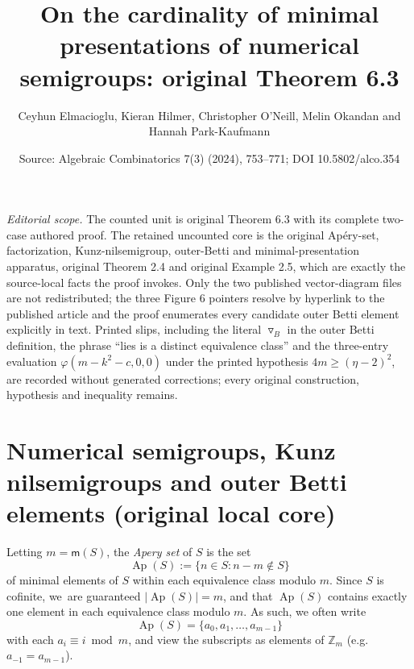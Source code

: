 \documentclass[10pt,a4paper]{amsart}
\title[Presentation cardinality in embedding dimension four]{On the cardinality of minimal presentations of numerical semigroups: original Theorem 6.3}
\author{Ceyhun Elmacioglu, Kieran Hilmer, Christopher O'Neill, Melin Okandan and Hannah Park-Kaufmann}
\date{Source: Algebraic Combinatorics 7(3) (2024), 753--771; DOI 10.5802/alco.354}
\newcommand\ZZ{\mathbb{Z}}
\DeclareMathOperator\Ap{Ap}
\begin{document}
\maketitle
\noindent\textit{Editorial scope.} The counted unit is original Theorem 6.3 with its complete two-case authored proof. The retained uncounted core is the original Ap\'ery-set, factorization, Kunz-nilsemigroup, outer-Betti and minimal-presentation apparatus, original Theorem 2.4 and original Example 2.5, which are exactly the source-local facts the proof invokes. Only the two published vector-diagram files are not redistributed; the three Figure 6 pointers resolve by hyperlink to the published article and the proof enumerates every candidate outer Betti element explicitly in text. Printed slips, including the literal $\triangledown_B$ in the outer Betti definition, the phrase ``lies is a distinct equivalence class'' and the three-entry evaluation $\varphi(m-k^2-c,0,0)$ under the printed hypothesis $4m\geq(\eta-2)^2$, are recorded without generated corrections; every original construction, hypothesis and inequality remains.
\section{Numerical semigroups, Kunz nilsemigroups and outer Betti elements (original local core)}
Letting $m = \mathsf m(S)$, the \emph{Apery set} of $S$ is the set
$$\Ap(S) := \{n \in S: n - m \notin S\}$$
of minimal elements of $S$ within each equivalence class modulo $m$.  Since $S$ is cofinite, we~are guaranteed $|\!\Ap(S)| = m$, and that $\Ap(S)$ contains exactly one element in each equivalence class modulo $m$.  As such, we often write
$$\Ap(S) = \{a_0, a_1, \ldots, a_{m-1}\}$$
with each $a_i \equiv i \bmod m$, and view the subscripts as elements of $\ZZ_m$ (e.g. $a_{-1} = a_{m-1}$).  
\end{document}

